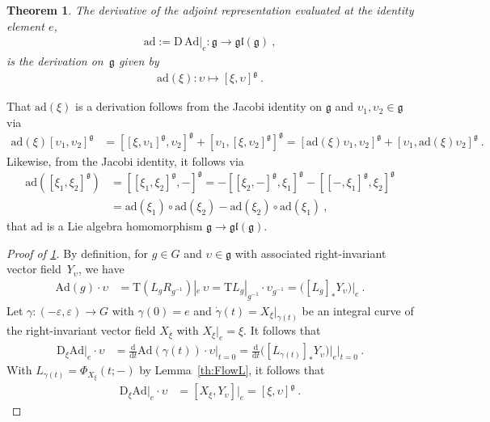 \documentclass[10pt,a4paper]{article}
\theoremstyle{mytheorem}
\newtheorem{theorem}{Theorem}[section]
\theoremstyle{mydefinition}
\newcommand{\dt}{\mathrm{d}}
\newcommand{\Dt}{\mathrm{D}}
\newcommand{\Tt}{\mathrm{T}}
\newcommand{\ad}{\mathrm{ad}}
\newcommand{\Ad}{\mathrm{Ad}}
\newcommand{\fg}{\mathfrak{g}}
\begin{document}
\begin{theorem}
\label{th:ad}
The derivative of the adjoint representation evaluated at the identity element $e$,
\begin{align*}
	\ad:=\Dt\,\Ad|_e: \mathfrak{g}\rightarrow\mathfrak{gl}(\mathfrak{g})
	\ ,
\end{align*}
is the derivation on~$\mathfrak{g}$ given by
\begin{align*}
	\ad(\xi): \upsilon\mapsto[\xi,\upsilon]^\fg
	\ .
\end{align*}
\end{theorem}
That $\ad(\xi)$ is a derivation follows from the Jacobi identity on $\mathfrak{g}$ and $\upsilon_1,\upsilon_2\in\fg$ via
\begin{align*}
\ad(\xi) [\upsilon_1,\upsilon_2]^\fg
&= 
[[\xi, \upsilon_1]^\fg,\upsilon_2]^\fg + [\upsilon_1, [\xi, \upsilon_2]^\fg]^\fg
=[\ad(\xi) \upsilon_1,\upsilon_2]^\fg + [\upsilon_1,\ad(\xi)\upsilon_2]^\fg
\ .
\end{align*}
Likewise, from the Jacobi identity, it follows via
\begin{align*}
	\ad([\xi_1,\xi_2]^\fg)
	&= [[\xi_1,\xi_2]^\fg, -]^\fg
	= -[[\xi_2,-]^\fg, \xi_1]^\fg-[[-,\xi_1]^\fg, \xi_2]^\fg
	\nonumber\\
	&= \ad(\xi_1)\circ \ad(\xi_2) - \ad(\xi_2)\circ \ad(\xi_1)
	\ ,
\end{align*}
that $\ad$ is a Lie algebra homomorphism $\mathfrak{g}\rightarrow\mathfrak{gl}(\mathfrak{g})$.

\begin{proof}[Proof of \ref{th:ad}]
By definition, for $g\in G$ and $\upsilon\in\mathfrak{g}$ with associated right-invariant vector field~$Y_\upsilon$, we have
\begin{align*}
	\Ad(g)\cdot\upsilon
	&= 
	\Tt(L_{g}R_{g^{-1}})|_e\,\upsilon
	=
	\Tt L_{g}|_{g^{-1}}
	\cdot
	\upsilon_{g^{-1}}
	=  
	\big(
		[L_{g}]_* Y_\upsilon
	\big)
	\big|_e
	\ .	
\end{align*}
Let $\gamma:(-\varepsilon,\varepsilon)\rightarrow G$ with $\gamma(0)=e$ and $\dot{\gamma}(t)=X_\xi|_{\gamma(t)}$ be an integral curve of the right-invariant vector field $X_\xi$ with $X_\xi|_e=\xi$.
It follows that
\begin{align*}
	\Dt_{\xi}\Ad|_e\cdot\upsilon
	&=
	\frac{\dt}{\dt t}
	\Ad(\gamma(t))\cdot\upsilon
	\Big|_{t=0}
	=
	\frac{\dt}{\dt t}
	\big(
		[L_{\gamma(t)}]_* Y_\upsilon
	\big)
	\big|_e
	\Big|_{t=0}
	\ .
\end{align*}
With $L_{\gamma(t)}=\Phi_{X_\xi}(t;-)$ by Lemma~\ref{th:FlowL}, it follows that
\begin{align*}
	\Dt_{\xi}\Ad|_e\cdot\upsilon
	&=
	[X_\xi,Y_\upsilon]|_e = [\xi, \upsilon]^\mathfrak{g}
	\ .
\end{align*}
\end{proof}
	
\end{document}
